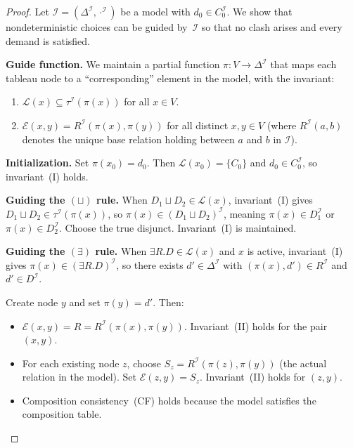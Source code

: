 \documentclass[a4paper,11pt]{article}
\theoremstyle{definition}
\newcommand{\DeltaI}{\ensuremath{\Delta^{\mathcal{I}}}}
\newcommand{\interp}{\ensuremath{\mathcal{I}}}
\begin{document}
\begin{proof}
Let $\interp = (\DeltaI, \cdot^{\interp})$ be a model with $d_0 \in
C_0^{\interp}$.  We show that nondeterministic choices can be guided
by~$\interp$ so that no clash arises and every demand is satisfied.

\medskip\noindent\textbf{Guide function.}\;  We maintain a partial
function $\pi \colon V \to \DeltaI$ that maps each tableau node to a
``corresponding'' element in the model, with the invariant:
\begin{enumerate}[label=(\Roman*),nosep]
  \item $\mathcal{L}(x) \subseteq \tau^{\interp}(\pi(x))$ for all
    $x \in V$.
  \item $\mathcal{E}(x,y) = R^{\interp}(\pi(x), \pi(y))$ for all
    distinct $x, y \in V$ (where $R^{\interp}(a,b)$ denotes the
    unique base relation holding between $a$ and $b$ in $\interp$).
\end{enumerate}

\medskip\noindent\textbf{Initialization.}\;
Set $\pi(x_0) = d_0$.  Then $\mathcal{L}(x_0) = \{C_0\}$ and $d_0
\in C_0^{\interp}$, so invariant~(I) holds.

\medskip\noindent\textbf{Guiding the $(\sqcup)$ rule.}\;
When $D_1 \sqcup D_2 \in \mathcal{L}(x)$, invariant~(I) gives $D_1
\sqcup D_2 \in \tau^{\interp}(\pi(x))$, so $\pi(x) \in (D_1 \sqcup
D_2)^{\interp}$, meaning $\pi(x) \in D_1^{\interp}$ or $\pi(x) \in
D_2^{\interp}$.  Choose the true disjunct.  Invariant~(I) is
maintained.

\medskip\noindent\textbf{Guiding the $(\exists)$ rule.}\;
When $\exists R.D \in \mathcal{L}(x)$ and $x$ is active, invariant~(I)
gives $\pi(x) \in (\exists R.D)^{\interp}$, so there exists $d' \in
\DeltaI$ with $(\pi(x), d') \in R^{\interp}$ and $d' \in
D^{\interp}$.

Create node $y$ and set $\pi(y) = d'$.  Then:
\begin{itemize}[nosep]
  \item $\mathcal{E}(x,y) = R = R^{\interp}(\pi(x), \pi(y))$.
    Invariant~(II) holds for the pair $(x,y)$.
  \item For each existing node $z$, choose $S_z =
    R^{\interp}(\pi(z), \pi(y))$ (the actual relation in the model).
    Set $\mathcal{E}(z,y) = S_z$.  Invariant~(II) holds for $(z,y)$.
  \item Composition consistency~(CF) holds because the model satisfies
    the composition table.
\end{itemize}


\end{proof}
\end{document}
